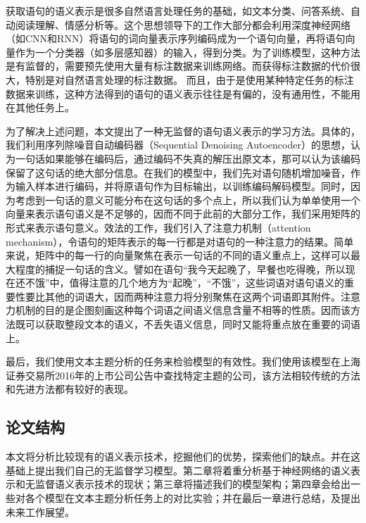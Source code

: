 \documentclass[UTF8,11pt,a4paper,nofonts]{ctexart}
\begin{document}
获取语句的语义表示是很多自然语言处理任务的基础，如文本分类\cite{lai2015recurrent}、问答系统\cite{li2016dataset}、自动阅读理解\cite{cheng2016long}、情感分析\cite{Mntyl2016TheEO}等。这个思想领导下的工作大部分都会利用深度神经网络（如CNN\cite{lecun1998gradient,fukushima1982neocognitron}和RNN\cite{elman1990finding}）将语句的词向量表示序列编码成为一个语句向量，再将语句向量作为一个分类器（如多层感知器）的输入，得到分类。为了训练模型，这种方法是有监督的，需要预先使用大量有标注数据来训练网络。而获得标注数据的代价很大，特别是对自然语言处理的标注数据。
而且，由于是使用某种特定任务的标注数据来训练，这种方法得到的语句的语义表示往往是有偏的，没有通用性，不能用在其他任务上。

为了解决上述问题，本文提出了一种无监督的语句语义表示的学习方法。具体的，我们利用序列除噪音自动编码器（Sequential Denoising Autoencoder）的思想，认为一句话如果能够在编码后，通过编码不失真的解压出原文本，那可以认为该编码保留了这句话的绝大部分信息。在我们的模型中，我们先对语句随机增加噪音，作为输入样本进行编码，并将原语句作为目标输出，以训练编码解码模型。同时，因为考虑到一句话的意义可能分布在这句话的多个点上，所以我们认为单单使用一个向量来表示语句语义是不足够的，因而不同于此前的大部分工作，我们采用矩阵的形式来表示语句意义。效法\cite{lin2017structured}的工作，我们引入了注意力机制（attention mechanism），令语句的矩阵表示的每一行都是对语句的一种注意力的结果。简单来说，矩阵中的每一行的向量聚焦在表示一句话的不同的语义重点上，这样可以最大程度的捕捉一句话的含义。譬如在语句“我今天起晚了，早餐也吃得晚，所以现在还不饿”中，值得注意的几个地方为“起晚”，“不饿”，这些词语对语句语义的重要性要比其他的词语大，因而两种注意力将分别聚焦在这两个词语即其附件。注意力机制的目的是企图刻画这种每个词语之间语义信息含量不相等的性质。因而该方法既可以获取整段文本的语义，不丢失语义信息，同时又能将重点放在重要的词语上。

最后，我们使用文本主题分析的任务来检验模型的有效性。我们使用该模型在上海证券交易所2016年的上市公司公告中查找特定主题的公司，该方法相较传统的方法和先进方法都有较好的表现。


\subsection{论文结构}
本文将分析比较现有的语义表示技术，挖掘他们的优势，探索他们的缺点。并在这基础上提出我们自己的无监督学习模型。第二章将着重分析基于神经网络的语义表示和无监督语义表示技术的现状；第三章将描述我们的模型架构；第四章会给出一些对各个模型在文本主题分析任务上的对比实验；并在最后一章进行总结，及提出未来工作展望。
\end{document}
